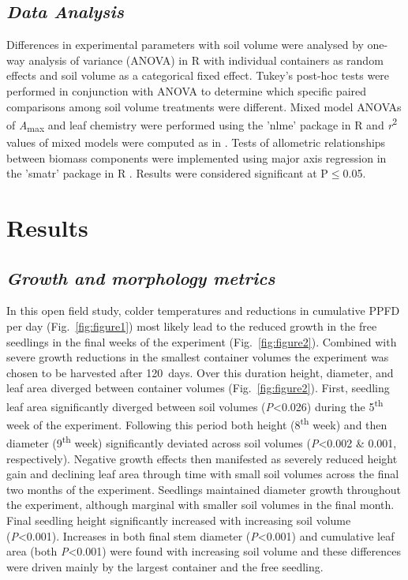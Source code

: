 \documentclass[a4paper]{article}\usepackage[]{graphicx}\usepackage[]{color}
\begin{document}
\subsection*{\textit{Data Analysis}}
Differences in experimental parameters with soil volume were analysed by one-way analysis of variance (ANOVA) in R with individual containers as random effects and soil volume as a categorical fixed effect. Tukey’s post-hoc tests were performed in conjunction with ANOVA to determine which specific paired comparisons among soil volume treatments were different. Mixed model ANOVAs of \textit{A}\textsubscript{max} and leaf chemistry were performed using the 'nlme' package \citep{nlme} in R and \textit{r}\textsuperscript{2} values of mixed models were computed as in \citet{nakagawa2013general}. Tests of allometric relationships between biomass components were implemented using major axis regression in the 'smatr' package in R \citep{warton2012smatr}. Results were considered significant at P$\leq$0.05.

\section*{Results}

\subsection*{\textit{Growth and morphology metrics}}
In this open field study, colder temperatures and reductions in cumulative PPFD per day (Fig.~\ref{fig:figure1}) most likely lead to the reduced growth in the free seedlings in the final weeks of the experiment (Fig.~\ref{fig:figure2}).  Combined with severe growth reductions in the smallest container volumes the experiment was chosen to be harvested after 120~days. Over this duration height, diameter, and leaf area diverged between container volumes (Fig.~\ref{fig:figure2}).  First, seedling leaf area significantly diverged between soil volumes (\textit{P}\textless0.026) during the 5\textsuperscript{th} week of the experiment. Following this period both height (8\textsuperscript{th} week) and then diameter (9\textsuperscript{th} week) significantly deviated across soil volumes (\textit{P}\textless0.002 \& 0.001, respectively).  Negative growth effects then manifested as severely reduced height gain and declining leaf area through time with small soil volumes across the final two months of the experiment. Seedlings maintained diameter growth throughout the experiment, although marginal with smaller soil volumes in the final month. Final seedling height significantly increased with increasing soil volume (\textit{P}\textless0.001).  Increases in both final stem diameter (\textit{P}\textless0.001) and cumulative leaf area (both \textit{P}\textless0.001) were found with increasing soil volume and these differences were driven mainly by the largest container and the free seedling.
\end{document}
